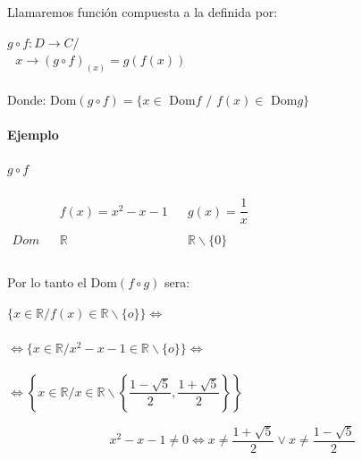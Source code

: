 Llamaremos función compuesta a la definida por:
\begin{center}
$g\circ f:D\longrightarrow C/$\\
$ $\qquad $ $ \qquad $ $ \qquad $x \longrightarrow (g\circ f)_{(x)}=g(f(x))$\\
\qquad\\
Donde: Dom$(g\circ f) = \{x \in $ Dom$f$ $/$ $f(x) \in $ Dom$g\}$\\
\end{center}

\paragraph{Ejemplo}
$g\circ f$\\
\\
$
\begin{array}{ccccc}

    & &f(x)=x^2-x-1 & & g(x)=\dfrac{1}{x}\\
 \\
Dom & & \mathbb{R} & & \mathbb{R}\smallsetminus\{0\} \\

\end{array}$\\
\\

Por lo tanto el Dom$(f\circ g)$ sera:
\\

\hfill
\begin{minipage}{.45\textwidth}
\begin{center}
$\{ x \in \mathbb{R} / f(x) \in \mathbb{R}\smallsetminus \{o\}\} \Leftrightarrow $\\
\qquad\\

$\Leftrightarrow \{ x \in \mathbb{R} / x^2-x-1 \in \mathbb{R}\smallsetminus \{o\}\} \Leftrightarrow $\\
\qquad\\

$\Leftrightarrow \left\{ x \in \mathbb{R} / x \in \mathbb{R}\smallsetminus \left\{\dfrac{1-\sqrt{5}}{2}, \dfrac{1+\sqrt{5}}{2}\right\}\right\} $\\

\end{center} 
\end{minipage}
\hfill
\begin{minipage}{.45\textwidth}
$$x^2-x-1 \neq 0 \Leftrightarrow x\neq \dfrac{1+\sqrt{5}}{2} \vee x\neq \dfrac{1-\sqrt{5}}{2}$$
\end{minipage}
\hfill\\
\\

